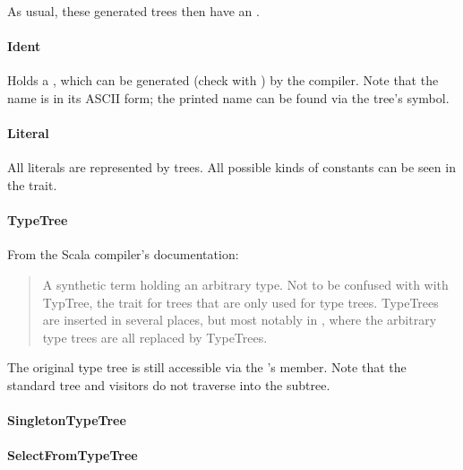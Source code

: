As usual, these generated trees then have an .

\paragraph{Ident} 

\noindent Holds a , which can be generated (check with ) by the compiler. Note that the name is in its ASCII form; the printed name can be found via the tree's symbol.

\paragraph{Literal} 

\noindent All literals are represented by  trees. All possible kinds of constants can be seen in the  trait.

\paragraph{TypeTree} 

\noindent From the Scala compiler's documentation: 

\begin{quote}
A synthetic term holding an arbitrary type. Not to be confused with with TypTree, the trait for trees that are only used for type trees. TypeTrees are inserted in several places, but most notably in , where the arbitrary type trees are all replaced by TypeTrees.\end{quote}

The original type tree is still accessible via the 's  member. Note that the standard tree  and  visitors do not traverse into the  subtree.

\paragraph{SingletonTypeTree} 

\paragraph{SelectFromTypeTree} 


